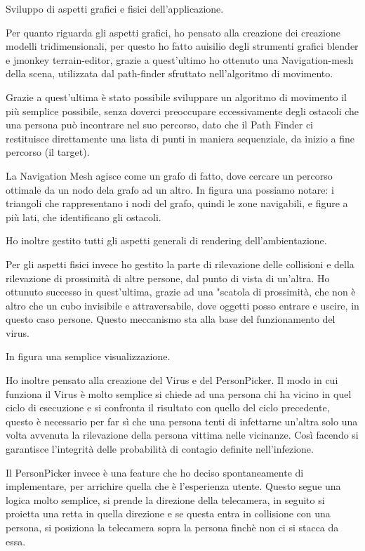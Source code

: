 Sviluppo di aspetti grafici e fisici dell'applicazione.

Per quanto riguarda gli aspetti grafici, ho pensato alla creazione dei creazione modelli tridimensionali, per questo ho fatto auisilio degli strumenti grafici blender e jmonkey terrain-editor, grazie a quest'ultimo ho ottenuto una Navigation-mesh della scena, utilizzata dal path-finder sfruttato nell'algoritmo di movimento.

Grazie a quest'ultima è stato possibile sviluppare un algoritmo di movimento il più semplice possibile, senza doverci preoccupare eccessivamente degli ostacoli che una persona può incontrare nel suo percorso,
dato che il Path Finder ci restituisce direttamente una lista di punti in maniera sequenziale, da inizio a fine percorso (il target).

La Navigation Mesh agisce come un grafo di fatto, dove cercare un percorso ottimale da un nodo dela grafo ad un altro.
In figura una possiamo notare: i triangoli che rappresentano i nodi del grafo, quindi le zone navigabili, e figure a più lati, che identificano gli ostacoli.

Ho inoltre gestito tutti gli aspetti generali di rendering dell'ambientazione.

Per gli aspetti fisici invece ho gestito la parte di rilevazione delle collisioni e della rilevazione di prossimità di altre persone, dal punto di vista di un'altra.
Ho ottunuto successo in quest'ultima, grazie ad una "scatola di prossimità, che non è altro che un cubo invisibile e attraversabile, dove oggetti posso entrare e uscire, in questo caso persone.
Questo meccanismo sta alla base del funzionamento del virus.

In figura una semplice visualizzazione.

Ho inoltre pensato alla creazione del Virus e del PersonPicker.
Il modo in cui funziona il Virus è molto semplice si chiede ad una persona chi ha vicino in quel ciclo di esecuzione e si confronta il risultato con quello del ciclo precedente, questo è necessario per far sì che una persona tenti di infettarne un'altra solo una volta avvenuta la rilevazione della persona vittima nelle vicinanze.
Così facendo si garantisce l'integrità delle probabilità di contagio definite nell'infezione.

Il PersonPicker invece è una feature che ho deciso spontaneamente di implementare, per arrichire quella che è l'esperienza utente.
Questo segue una logica molto semplice, si prende la direzione della telecamera, in seguito si proietta una retta in quella direzione e se questa entra in collisione con una persona, si posiziona la telecamera sopra la persona finchè non ci si stacca da essa.

